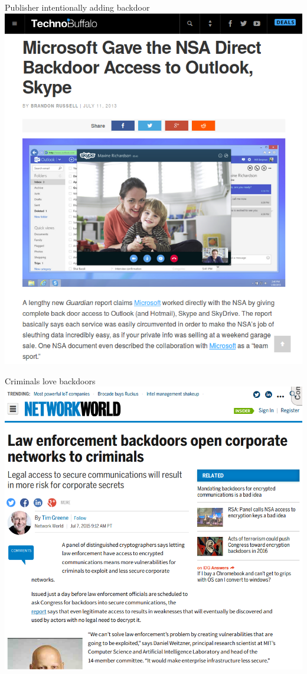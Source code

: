 \documentclass[11pt]{beamer}
\begin{document}
\begin{frame}{Publisher intentionally adding backdoor}
\includegraphics[scale=0.27]{skype.png}
\end{frame}

\begin{frame}{Criminals love backdoors}
\includegraphics[scale=0.28]{backdoor_criminals.png}
\end{frame}
\end{document}
